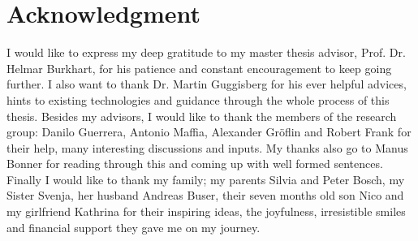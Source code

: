 \chapter*{Acknowledgment}
I would like to express my deep gratitude to my master thesis advisor, Prof. Dr. Helmar Burkhart, for his patience and constant encouragement to keep going further.
I also want to thank Dr. Martin Guggisberg for his ever helpful advices, hints to existing technologies and guidance through the whole process of this thesis.
Besides my advisors, I would like to thank the members of the research group: Danilo Guerrera,
Antonio Maffia, Alexander Gr\"oflin and Robert Frank for their help, many interesting discussions and inputs.
My thanks also go to Manus Bonner for reading through this and coming up with well formed sentences.
Finally I would like to thank my family; my parents Silvia and Peter Bosch, my Sister Svenja, her husband Andreas Buser, their seven months old son Nico and my girlfriend Kathrina for their inspiring ideas, the joyfulness, irresistible smiles and financial support they gave me on my journey.